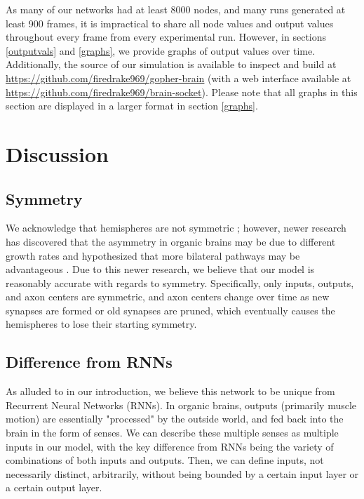 \documentclass[12pt]{article}
\begin{document}
As many of our networks had at least 8000 nodes, and many runs generated at least 900 frames, it is impractical to share all node values and output values throughout every frame from every experimental run.  However, in sections \ref{outputvals} and \ref{graphs}, we provide graphs of output values over time.  Additionally, the source of our simulation is available to inspect and build at \url{https://github.com/firedrake969/gopher-brain} (with a web interface available at \url{https://github.com/firedrake969/brain-socket}).  Please note that all graphs in this section are displayed in a larger format in section \ref{graphs}.

\section{Discussion} \label{discussion}

\subsection{Symmetry} \label{symmetry}

We acknowledge that hemispheres are not symmetric \cite{hemisphereasymmetry}; however, newer research has discovered that the asymmetry in organic brains may be due to different growth rates \cite{hemispheredev} and hypothesized that more bilateral pathways may be advantageous \cite{recallasymmetry}.  Due to this newer research, we believe that our model is reasonably accurate with regards to symmetry.  Specifically, only inputs, outputs, and axon centers are symmetric, and axon centers change over time as new synapses are formed or old synapses are pruned, which eventually causes the hemispheres to lose their starting symmetry.

\subsection{Difference from RNNs} \label{rnndiff}

As alluded to in our introduction, we believe this network to be unique from Recurrent Neural Networks (RNNs).  In organic brains, outputs (primarily muscle motion) are essentially "processed" by the outside world, and fed back into the brain in the form of senses.  We can describe these multiple senses as multiple inputs in our model, with the key difference from RNNs being the variety of combinations of both inputs and outputs.  Then, we can define inputs, not necessarily distinct, arbitrarily, without being bounded by a certain input layer or a certain output layer.
\end{document}
